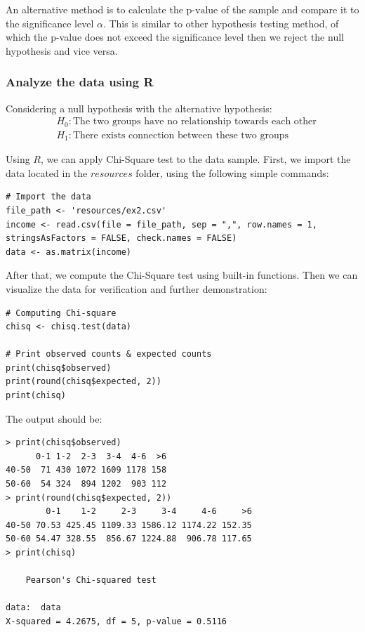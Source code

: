 \documentclass[a4paper]{article}
\numberwithin{equation}{section}
\begin{document}
An alternative method is to calculate the \(\text{p-value}\) of the sample and compare it to the significance level \( \alpha \). This is similar to other hypothesis testing method, of which the p-value does not exceed the significance level then we reject the null hypothesis and vice versa.

\subsubsection{Analyze the data using R}\label{p2:anal}
Considering a null hypothesis with the alternative hypothesis:
\begin{align*}
   & H_0 : \text{The two groups have no relationship towards each other} \\
   & H_1 : \text{There exists connection between these two groups}
\end{align*}

Using \(R\), we can apply Chi-Square test to the data sample. First, we import the data located in the \(resources\) folder, using the following simple commands:
\begin{mdframed}[leftline=false,rightline=false,backgroundcolor=magenta!10,nobreak=true]
  \begin{verbatim}
# Import the data
file_path <- 'resources/ex2.csv'
income <- read.csv(file = file_path, sep = ",", row.names = 1, stringsAsFactors = FALSE, check.names = FALSE)
data <- as.matrix(income)
  \end{verbatim}
\end{mdframed}

After that, we compute the Chi-Square test using built-in functions. Then we can visualize the data for verification and further demonstration:
\begin{mdframed}[leftline=false,rightline=false,backgroundcolor=magenta!10,nobreak=true]
  \begin{verbatim}
# Computing Chi-square
chisq <- chisq.test(data)

# Print observed counts & expected counts
print(chisq$observed)
print(round(chisq$expected, 2))
print(chisq)
  \end{verbatim}
\end{mdframed}

The output should be:
\begin{mdframed}[leftline=false,rightline=false,backgroundcolor=magenta!10,nobreak=true]
  \begin{verbatim}
> print(chisq$observed)
      0-1 1-2  2-3  3-4  4-6  >6
40-50  71 430 1072 1609 1178 158
50-60  54 324  894 1202  903 112
> print(round(chisq$expected, 2))
        0-1    1-2     2-3     3-4     4-6     >6
40-50 70.53 425.45 1109.33 1586.12 1174.22 152.35
50-60 54.47 328.55  856.67 1224.88  906.78 117.65
> print(chisq)

	Pearson's Chi-squared test

data:  data
X-squared = 4.2675, df = 5, p-value = 0.5116
  \end{verbatim}
\end{mdframed}
\end{document}
